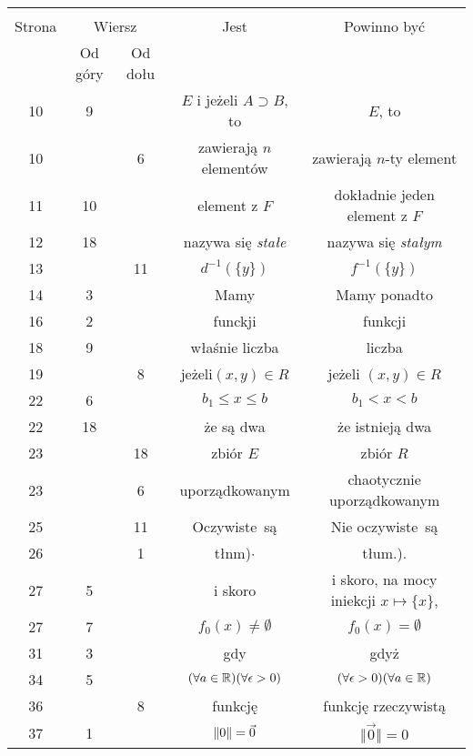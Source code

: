 \documentclass[a4paper,11pt]{article}
\begin{document}
\begin{center}

  \begin{tabular}{|c|c|c|c|c|}
    \hline
    & \multicolumn{2}{c|}{} & & \\
    Strona & \multicolumn{2}{c|}{Wiersz} & Jest
                              & Powinno być \\ \cline{2-3}
    & Od góry & Od dołu & & \\
    \hline
    10  &  9 & & $E$ i jeżeli $A \supset B$, to & $E$, to \\
    10  & &  6 & zawierają $n$ elementów & zawierają $n$-ty element \\
    11  & 10 & & element z $F$ & dokładnie jeden element z $F$ \\
    12  & 18 & & nazywa się \textit{stałe} & nazywa się \textit{stałym} \\
    13  & & 11 & $d^{ -1 }( \{ y \} )$ & $f^{ -1 }( \{ y \} )$ \\
    14  &  3 & & Mamy & Mamy ponadto \\
    16  &  2 & & funckji & funkcji \\
    18  &  9 & & właśnie liczba & liczba \\
    19  & &  8 & jeżeli$( x, y ) \in R$ & jeżeli $( x, y ) \in R$ \\
    22  &  6 & & $b_{ 1 } \leq x \leq b$ & $b_{ 1 } < x < b$ \\
    22  & 18 & & że są dwa & że istnieją dwa \\
    23  & & 18 & zbiór $E$ & zbiór $R$ \\
    23  & &  6 & uporządkowanym & chaotycznie uporządkowanym \\
    25  & & 11 & Oczywiste~są & Nie oczywiste~są \\
    26  & &  1 & tłnm)$\cdot$ & tłum.). \\
    27  &  5 & & i skoro
           & i skoro, na mocy iniekcji $x \mapsto \{ x \}$, \\
    27  &  7 & & $f_{ 0 }( x ) \neq \emptyset$
           & $f_{ 0 }( x ) = \emptyset$ \\
    31  &  3 & & gdy & gdyż \\
    34  &  5 & & $( \forall a \in \mathbb{R} ) ( \forall \epsilon > 0 )$
           & $( \forall \epsilon > 0 ) ( \forall a \in \mathbb{R} )$ \\
    36  & &  8 & funkcję & funkcję rzeczywistą \\
    37  &  1 & & $\Vert 0 \Vert = \vec{ 0 }$ & $\Vert \vec{ 0 } \Vert = 0$ \\

\end{tabular}
\end{center}
\end{document}
